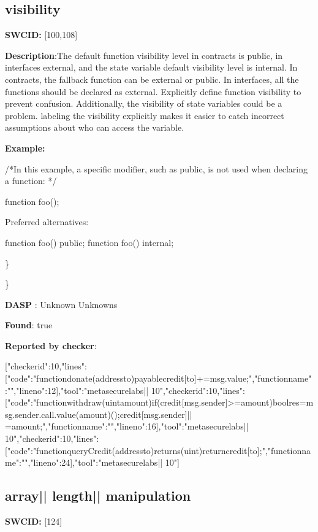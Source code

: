 \documentclass{article}
\begin{document}
\subsection{visibility} 
\textbf{SWC{\textunderscore }ID:} [100,108]

\textbf{Description}:The default function visibility level in contracts is public, in interfaces {\textendash} external,  and the state variable default visibility level is internal. In contracts, the fallback function can be external or public. In interfaces, all the functions should be declared as external. Explicitly define function visibility to prevent confusion.
Additionally, the visibility of state variables could be a problem. labeling the visibility explicitly makes it easier to catch incorrect assumptions about who can access the variable.


\textbf{Example:} 
\begin{ffcode} 

/*In this example, a specific modifier, such as public, is not used when declaring a function: */ 

function foo();

Preferred alternatives:

function foo() public;
function foo() internal;

\end{ffcode} 
\} 

\} 

\textbf{DASP} : Unknown Unknowns

\textbf{Found}: true

\textbf{Reported by checker}: 
\begin{ffcode} 

[{"checker\textunderscore id":10,"lines":[{"code":"functiondonate(addressto)payable{credit[to]+=msg.value;}","function\textunderscore name":"","line\textunderscore no":12}],"tool":"metasecurelabs|\textendash| 10"},{"checker\textunderscore id":10,"lines":[{"code":"functionwithdraw(uintamount){if(credit[msg.sender]>=amount){boolres=msg.sender.call.value(amount)();credit[msg.sender]|\textendash| =amount;}}","function\textunderscore name":"","line\textunderscore no":16}],"tool":"metasecurelabs|\textendash| 10"},{"checker\textunderscore id":10,"lines":[{"code":"functionqueryCredit(addressto)returns(uint){returncredit[to];}","function\textunderscore name":"","line\textunderscore no":24}],"tool":"metasecurelabs|\textendash| 10"}]
\end{ffcode} 
\subsection{array{|\textunderscore| }length{|\textunderscore| }manipulation} 
\textbf{SWC{\textunderscore }ID:} [124]
\end{document}
